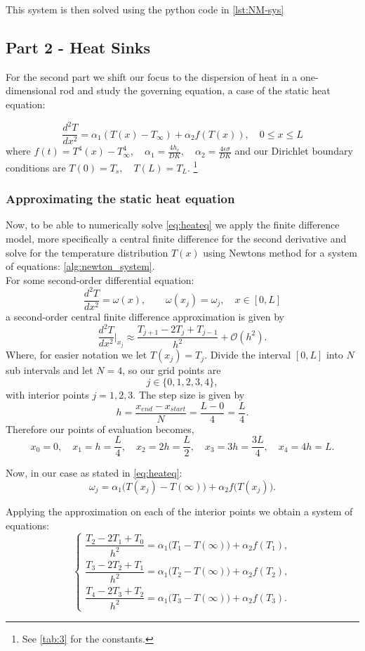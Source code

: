 \documentclass[11pt, a4paper]{article}
\theoremstyle{definition}
\begin{document}
This system is then solved using the python code in \cref{lst:NM-sys}
\subsection{Part 2 - Heat Sinks}
For the second part we shift our focus to the dispersion of heat in a one-dimensional rod and study the governing equation, a case of the static heat equation:

\begin{equation}
\label{eq:heateq}
\frac{d^2T}{dx^2} = \alpha_1(T(x) -T_\infty) + \alpha_2f(T(x)), \quad 0\leq x  \leq L
\end{equation}
where $ f(t) = T^4(x) - T^4_\infty, \quad \alpha_1 = \frac{4 h_c}{DK}, \quad \alpha_2 = \frac{4 \epsilon \sigma}{DK}$ and our Dirichlet boundary conditions are $T(0) = T_s , \quad T(L) = T_L$. \footnote{See \cref{tab:3} for the constants.}

\subsubsection{Approximating the static heat equation}
Now, to be able to numerically solve \cref{eq:heateq} we apply the finite difference model, more specifically a central finite difference for the second derivative and solve for the temperature distribution $T(x)$ using Newtons method for a system of equations: \cref{alg:newton_system}. \\

For some second-order differential equation:
$$
\frac{d^2T}{dx^2} = \omega(x), \qquad \omega(x_j) = \omega_j, \quad x \in [0, L]
$$
a second-order central finite difference approximation is given by
$$
\frac{d^2T}{dx^2}\bigg|_{x_j}
\approx
\frac{T_{j+1} - 2T_j + T_{j-1}}{h^2}
+ \mathcal{O}(h^2).
$$
Where, for easier notation we let \( T(x_j) = T_j \). \newline
Divide the interval \([0,L]\) into $N$ sub intervals and let \(N=4\), so our grid points are
$$
j \in \{0,1,2,3,4\},
$$
with interior points \(j=1,2,3\). The step size is given by
$$
h = \frac{x_{end}-x_{start}}{N} = \frac{L-0}{4} = \frac{L}{4}.
$$
Therefore our points of evaluation becomes,
$$
x_0 = 0,\quad x_1 = h = \frac{L}{4},\quad x_2 = 2h = \frac{L}{2},\quad x_3 = 3h = \frac{3L}{4},\quad x_4 = 4h = L.
$$

Now, in our case as stated in \cref{eq:heateq}:
$$
\omega_j = \alpha_1\big(T(x_j) - T(\infty)\big) + \alpha_2 f\!\big(T(x_j)\big).
$$

Applying the approximation on each of the interior points we obtain a system of equations:
\[
\begin{cases}
\dfrac{T_2 - 2T_1 + T_0}{h^2}
=
\alpha_1\big(T_1 - T(\infty)\big) + \alpha_2 f(T_1), \\[6pt]
\dfrac{T_3 - 2T_2 + T_1}{h^2}
=
\alpha_1\big(T_2 - T(\infty)\big) + \alpha_2 f(T_2), \\[6pt]
\dfrac{T_4 - 2T_3 + T_2}{h^2}
=
\alpha_1\big(T_3 - T(\infty)\big) + \alpha_2 f(T_3).
\end{cases}
\]
\end{document}
